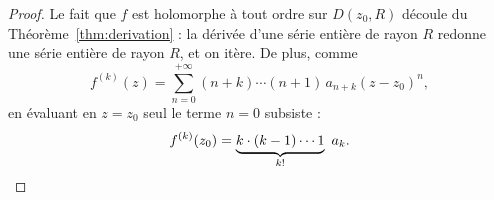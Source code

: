 \begin{proof}
Le fait que $f$ est holomorphe à tout ordre sur $D(z_0,R)$ découle du Théorème~\ref{thm:derivation} :
la dérivée d'une série entière de rayon $R$ redonne une série entière de rayon $R$, et on itère.
De plus, comme
\[
f^{(k)}(z) = \sum_{n=0}^{+\infty} (n+k)\cdots(n+1)\, a_{n+k} (z-z_0)^n ,
\]
en évaluant en $z = z_0$ seul le terme $n = 0$ subsiste :
\[
f^{(k)}(z_0) = \underbrace{k \cdot (k-1) \cdots 1}_{k!}\ a_k .
\qedhere
\]
\end{proof}